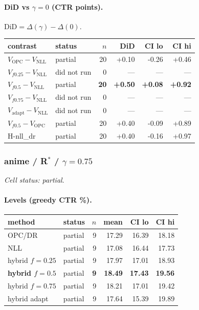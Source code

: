 \documentclass[10pt,a4paper]{article}
\begin{document}
\paragraph{DiD vs $\gamma=0$ (CTR points).} $\mathrm{DiD}=\Delta(\gamma)-\Delta(0)$.
{\centering\small\begin{tabular}{llrrrr}
\toprule contrast & status & $n$ & DiD & CI lo & CI hi \\
\midrule
$V_{\mathrm{OPC}}-V_{\mathrm{NLL}}$ & partial & 20 & +0.10 & -0.26 & +0.46 \\
$V_{f0.25}-V_{\mathrm{NLL}}$ & did not run & 0 & --- & --- & --- \\
\textbf{$V_{f0.5}-V_{\mathrm{NLL}}$} & partial & \textbf{20} & \textbf{+0.50} & \textbf{+0.08} & \textbf{+0.92} \\
$V_{f0.75}-V_{\mathrm{NLL}}$ & did not run & 0 & --- & --- & --- \\
$V_{\mathrm{adapt}}-V_{\mathrm{NLL}}$ & did not run & 0 & --- & --- & --- \\
$V_{f0.5}-V_{\mathrm{OPC}}$ & partial & 20 & +0.40 & -0.09 & +0.89 \\
H-nll\_dr & partial & 20 & +0.40 & -0.16 & +0.97 \\
\bottomrule\end{tabular}\par}
\bigskip
\subsubsection{anime / R$^*$ / $\gamma=0.75$}
\emph{Cell status: partial}.
\paragraph{Levels (greedy CTR \%).}
{\centering\small\begin{tabular}{llrrrr}
\toprule method & status & $n$ & mean & CI lo & CI hi \\
\midrule
OPC/DR & partial & 9 & 17.29 & 16.39 & 18.18 \\
NLL & partial & 9 & 17.08 & 16.44 & 17.73 \\
hybrid $f{=}0.25$ & partial & 9 & 17.97 & 17.01 & 18.93 \\
\textbf{hybrid $f{=}0.5$} & partial & \textbf{9} & \textbf{18.49} & \textbf{17.43} & \textbf{19.56} \\
hybrid $f{=}0.75$ & partial & 9 & 18.21 & 17.01 & 19.42 \\
hybrid adapt & partial & 9 & 17.64 & 15.39 & 19.89 \\
\bottomrule\end{tabular}\par}
\end{document}
